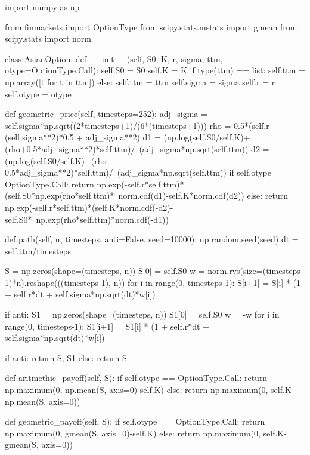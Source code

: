 \begin{ipython}
import numpy as np

from finmarkets import OptionType
from scipy.stats.mstats import gmean
from scipy.stats import norm

class AsianOption:
    def __init__(self, S0, K, r, sigma, ttm, otype=OptionType.Call):
        self.S0 = S0
        self.K = K
        if type(ttm) == list:
            self.ttm = np.array([t for t in ttm])
        else:
            self.ttm = ttm
        self.sigma = sigma
        self.r = r
        self.otype = otype

    def geometric_price(self, timesteps=252):
        adj_sigma = self.sigma*np.sqrt((2*timesteps+1)/(6*(timesteps+1)))
        rho = 0.5*(self.r-(self.sigma**2)*0.5 + adj_sigma**2)
        d1 = (np.log(self.S0/self.K)+(rho+0.5*adj_sigma**2)*self.ttm)/\
             (adj_sigma*np.sqrt(self.ttm))
        d2 = (np.log(self.S0/self.K)+(rho-0.5*adj_sigma**2)*self.ttm)/\
             (adj_sigma*np.sqrt(self.ttm))
        if self.otype == OptionType.Call:
            return np.exp(-self.r*self.ttm)*(self.S0*np.exp(rho*self.ttm)*\
            norm.cdf(d1)-self.K*norm.cdf(d2))
        else:
            return np.exp(-self.r*self.ttm)*(self.K*norm.cdf(-d2)-self.S0*\
                   np.exp(rho*self.ttm)*norm.cdf(-d1))

    def path(self, n, timesteps, anti=False, seed=10000):
        np.random.seed(seed)
        dt = self.ttm/timesteps
  
        S = np.zeros(shape=(timesteps, n))
        S[0] = self.S0
        w = norm.rvs(size=(timesteps-1)*n).reshape(((timesteps-1), n))
        for i in range(0, timesteps-1):
            S[i+1] = S[i] * (1 + self.r*dt  + self.sigma*np.sqrt(dt)*w[i])

        if anti:
            S1 = np.zeros(shape=(timesteps, n))
            S1[0] = self.S0
            w = -w
            for i in range(0, timesteps-1):
                S1[i+1] = S1[i] * (1 + self.r*dt  + self.sigma*np.sqrt(dt)*w[i])

        if anti:
            return S, S1
        else:
            return S

    def aritmethic_payoff(self, S):
        if self.otype == OptionType.Call:
            return np.maximum(0, np.mean(S, axis=0)-self.K)
        else:
            return np.maximum(0, self.K - np.mean(S, axis=0))

    def geometric_payoff(self, S):
        if self.otype == OptionType.Call:
            return np.maximum(0, gmean(S, axis=0)-self.K)
        else:
            return np.maximum(0, self.K-gmean(S, axis=0))


\end{ipython}
